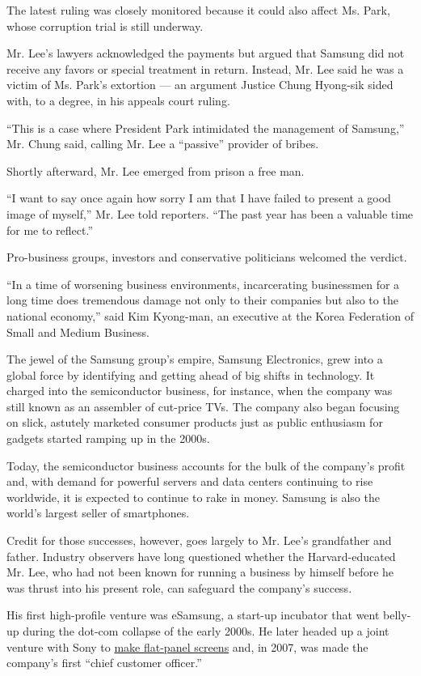 The latest ruling was closely monitored because it could also affect Ms.
Park, whose corruption trial is still underway.

Mr. Lee's lawyers acknowledged the payments but argued that Samsung did
not receive any favors or special treatment in return. Instead, Mr. Lee
said he was a victim of Ms. Park's extortion --- an argument Justice
Chung Hyong-sik sided with, to a degree, in his appeals court ruling.

``This is a case where President Park intimidated the management of
Samsung,'' Mr. Chung said, calling Mr. Lee a ``passive'' provider of
bribes.

Shortly afterward, Mr. Lee emerged from prison a free man.

``I want to say once again how sorry I am that I have failed to present
a good image of myself,'' Mr. Lee told reporters. ``The past year has
been a valuable time for me to reflect.''

Pro-business groups, investors and conservative politicians welcomed the
verdict.

``In a time of worsening business environments, incarcerating
businessmen for a long time does tremendous damage not only to their
companies but also to the national economy,'' said Kim Kyong-man, an
executive at the Korea Federation of Small and Medium Business.

The jewel of the Samsung group's empire, Samsung Electronics, grew into
a global force by identifying and getting ahead of big shifts in
technology. It charged into the semiconductor business, for instance,
when the company was still known as an assembler of cut-price TVs. The
company also began focusing on slick, astutely marketed consumer
products just as public enthusiasm for gadgets started ramping up in the
2000s.

Today, the semiconductor business accounts for the bulk of the company's
profit and, with demand for powerful servers and data centers continuing
to rise worldwide, it is expected to continue to rake in money. Samsung
is also the world's largest seller of smartphones.

Credit for those successes, however, goes largely to Mr. Lee's
grandfather and father. Industry observers have long questioned whether
the Harvard-educated Mr. Lee, who had not been known for running a
business by himself before he was thrust into his present role, can
safeguard the company's success.

His first high-profile venture was eSamsung, a start-up incubator that
went belly-up during the dot-com collapse of the early 2000s. He later
headed up a joint venture with Sony to
\href{http://www.nytimes.com/2011/12/27/technology/sony-sells-stake-in-lcd-panel-joint-venture.html}{make
flat-panel screens} and, in 2007, was made the company's first ``chief
customer officer.''


